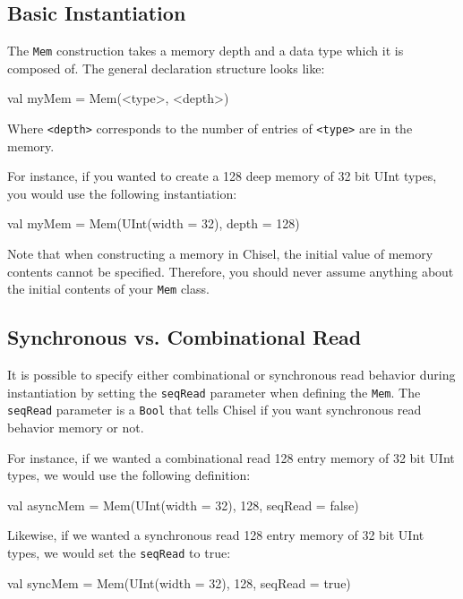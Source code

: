 \subsection{Basic Instantiation}

The \verb+Mem+ construction takes a memory depth and a data type which it is composed of. The general declaration structure looks like:

\begin{scala}
val myMem = Mem(<type>, <depth>)
\end{scala}

Where \verb+<depth>+ corresponds to the number of entries of \verb+<type>+ are in the memory.

For instance, if you wanted to create a 128 deep memory of 32 bit UInt types, you would use the following instantiation:

\begin{scala}
val myMem = Mem(UInt(width = 32), depth = 128)
\end{scala}

Note that when constructing a memory in Chisel, the initial value of memory contents cannot be specified. Therefore, you should never assume anything about the initial contents of your \verb+Mem+ class.

\subsection{Synchronous vs. Combinational Read}

It is possible to specify either combinational or synchronous read behavior during instantiation by setting the \verb+seqRead+ parameter when defining the \verb+Mem+. The \verb+seqRead+ parameter is a \verb+Bool+ that tells Chisel if you want synchronous read behavior memory or not.

For instance, if we wanted a combinational read 128 entry memory of 32 bit UInt types, we would use the following definition:

\begin{scala}
val asyncMem = Mem(UInt(width = 32), 128, seqRead = false)
\end{scala}

Likewise, if we wanted a synchronous read 128 entry memory of 32 bit UInt types, we would set the \verb+seqRead+ to true:

\begin{scala}
val syncMem = Mem(UInt(width = 32), 128, seqRead = true)
\end{scala}

